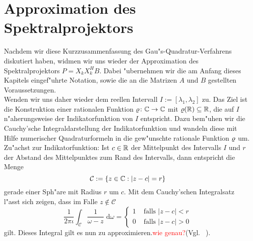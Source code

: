 \section{Approximation des Spektralprojektors}

Nachdem wir diese Kurzzusammenfassung des Gau"s-Quadratur-Verfahrens diskutiert haben,
widmen wir uns wieder der Approximation des Spektralprojektors
$P = X_k X_k^H B$. Dabei "ubernehmen wir die am Anfang dieses Kapitels eingef"uhrte Notation, sowie die an die Matrizen $A$ und $B$ gestellten Voraussetzungen.\\

Wenden wir uns daher wieder dem reellen Intervall $I := [\lambda_1, \lambda_2]$ zu. Das Ziel ist
die Konstruktion einer rationalen Funktion $\varrho\colon\mathbb{C}\to\mathbb{C}$ mit $\varrho(\mathbb{R}) \subseteq \mathbb{R}$,
die auf $I$ n"aherungsweise der Indikatorfunktion von $I$ entspricht. Dazu
bem"uhen wir die Cauchy'sche Integraldarstellung der Indikatorfunktion und
wandeln diese mit Hilfe numerischer Quadraturformeln in die gew"unschte
rationale Funktion $\varrho$ um.\\

Zu"achst zur Indikatorfunktion: Ist $c\in\mathbb{R}$ der Mittelpunkt des Intervalls $I$ und
$r$ der Abstand des Mittelpunktes zum Rand des Intervalls, dann entspricht die Menge
\[
\mathcal{C} := \{z\in\mathbb{C} : |z-c| = r\}
\]
gerade einer Sph"are mit Radius $r$ um $c$. Mit dem Cauchy'schen Integralsatz
l"asst sich zeigen, dass im Falle $z\notin \mathcal{C}$
\[
\frac{1}{2\pi\iota}\int_{ \mathcal{C}}\frac{1}{\omega-z}\text{ d}\omega
= \begin{cases}1 &\text{ falls }|z-c| < r \\ 0 &\text{ falls }|z-c| > 0 \end{cases}
\]
gilt. Dieses Integral gilt es nun zu approximieren.\textcolor{red}{wie genau?}(Vgl. ~\cite[20]{jaenich}).\\

